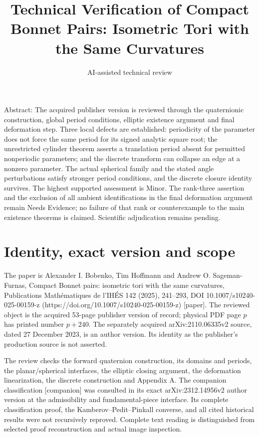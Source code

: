 \documentclass[10pt]{article}
\title{Technical Verification of
Compact Bonnet Pairs: Isometric Tori
with the Same Curvatures}
\author{AI-assisted technical review}
\date{}
\begin{document}
\maketitle
Abstract: The acquired publisher version is reviewed through the quaternionic construction, global period conditions, elliptic existence argument and final deformation step. Three local defects are established: periodicity of the parameter does not force the same period for its signed analytic square root; the unrestricted cylinder theorem asserts a translation period absent for permitted nonperiodic parameters; and the discrete transform can collapse an edge at a nonzero parameter. The actual spherical family and the stated angle perturbations satisfy stronger period conditions, and the discrete closure identity survives. The highest supported assessment is Minor. The rank-three assertion and the exclusion of all ambient identifications in the final deformation argument remain Needs Evidence; no failure of that rank or counterexample to the main existence theorems is claimed. Scientific adjudication remains pending.\par
\section*{Identity, exact version and scope}
The paper is Alexander I. Bobenko, Tim Hoffmann and Andrew O. Sageman-Furnas, Compact Bonnet pairs: isometric tori with the same curvatures, Publications Mathématiques de l’IHÉS 142 (2025), 241–293, DOI 10.1007/s10240-025-00159-z (https://doi.org/10.1007/s10240-025-00159-z) [paper]. The reviewed object is the acquired 53-page publisher version of record; physical PDF page \(p\) has printed number \(p+240\). The separately acquired arXiv:2110.06335v2 source, dated 27 December 2023, is an author version. Its identity as the publisher’s production source is not asserted.\par
The review checks the forward quaternion construction, its domains and periods, the planar/spherical interfaces, the elliptic closing argument, the deformation linearization, the discrete construction and Appendix A. The companion classification [companion] was consulted in its exact arXiv:2312.14956v2 author version at the admissibility and fundamental-piece interface. Its complete classification proof, the Kamberov–Pedit–Pinkall converse, and all cited historical results were not recursively reproved. Complete text reading is distinguished from selected proof reconstruction and actual image inspection.\par
\end{document}

